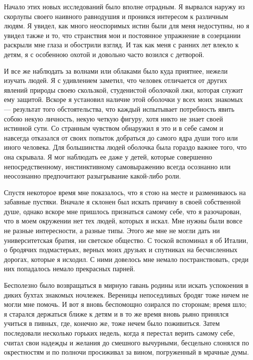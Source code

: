 Начало  этих  новых  исследований  было вполне  отрадным.  Я  вырвался
наружу из скорлупы  своего наивного равнодушия и  проникся интересом к
различным людям. Я  увидел, как много неоспоримых истин  были для меня
недоступны, но  я увидел также и  то, что странствия мои  и постоянное
упражнение в созерцании  раскрыли мне глаза и обострили  взгляд. И так
как меня с ранних лет влекло к  детям, я с особенною охотой и довольно
часто возился с детворой.

И все же наблюдать за волнами  или облаками было куда приятнее, нежели
изучать  людей. Я  с  удивлением заметил,  что  человек отличается  от
других  явлений природы  своею скользкой,  студенистой оболочкой  лжи,
которая служит ему защитой. Вскоре я установил наличие этой оболочки у
всех  моих  знакомых ---  результат  того  обстоятельства, что  каждый
испытывает  потребность  явить  собою  некую  личность,  некую  четкую
фигуру, хотя никто не знает  своей истинной сути. Со странным чувством
обнаружил  я  это  и  в  себе самом  и  навсегда  отказался  от  своих
попыток  добраться  до  самого  ядра души  того  или  иного  человека.
Для  большинства людей  оболочка  была гораздо  важнее  того, что  она
скрывала.  Я  мог  наблюдать  ее  даже  у  детей,  которые  совершенно
непосредственному, инстинктивному  самовыражению всегда  осознанно или
неосознанно предпочитают разыгрывание какой-либо роли.

Спустя  некоторое  время  мне  показалось,  что  я  стою  на  месте  и
размениваюсь на забавные пустяки. Вначале я склонен был искать причину
в своей собственной душе, однако вскоре мне пришлось признаться самому
себе, что я разочарован, что в моем окружении нет тех людей, которых я
искал. Мне  нужны были  вовсе не разные  интересности, а  разные типы.
Этого  же мне  не могли  дать ни  университетская братия,  ни светское
общество. С  тоской вспоминал  я об  Италии, о  бродячих подмастерьях,
верных моих  друзьях и  спутниках на  бесчисленных дорогах,  которые я
исходил.  С  ними  довелось  мне  немало  постранствовать,  среди  них
попадалось немало прекрасных парней.

Бесполезно  было  возвращаться  в  мирную  гавань  родины  или  искать
успокоения  в диких  бухтах знакомых  ночлежек. Вереницы  непоседливых
бродяг  тоже ничем  не  могли мне  помочь. И  вот  я вновь  беспомощно
озирался по сторонам; время шло; я  старался держаться ближе к детям и
в то же время вновь рьяно  принялся учиться в пивных, где, конечно же,
тоже  нечем  было  поживиться.  Затем  последовали  несколько  горьких
недель, когда  я перестал  верить самому себе,  считал свои  надежды и
желания до смешного вычурными, бесцельно слонялся по окрестностям и по
полночи просиживал за вином, погруженный в мрачные думы.

